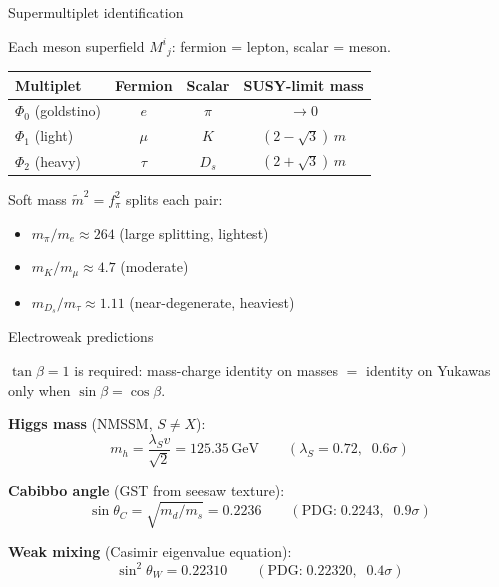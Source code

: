 \documentclass[aspectratio=169,12pt]{beamer}
\newcommand{\GeV}{\,\text{GeV}}
\newcommand{\fpi}{f_\pi}
\begin{document}
\begin{frame}{Supermultiplet identification}

Each meson superfield $M^i{}_j$: fermion = lepton,
scalar = meson.

\bigskip
\begin{center}
\begin{tabular}{lccc}
\toprule
Multiplet & Fermion & Scalar & SUSY-limit mass \\
\midrule
$\Phi_0$ (goldstino) & $e$ & $\pi$ & $\to 0$ \\
$\Phi_1$ (light) & $\mu$ & $K$ & $(2{-}\sqrt{3})\,m$ \\
$\Phi_2$ (heavy) & $\tau$ & $D_s$ & $(2{+}\sqrt{3})\,m$ \\
\bottomrule
\end{tabular}
\end{center}

\bigskip
Soft mass $\tilde m^2 = \fpi^2$ splits each pair:
\begin{itemize}
\item $m_\pi/m_e \approx 264$ (large splitting, lightest)
\item $m_K/m_\mu \approx 4.7$ (moderate)
\item $m_{D_s}/m_\tau \approx 1.11$ (near-degenerate, heaviest)
\end{itemize}

\end{frame}

\begin{frame}{Electroweak predictions}

\textbf{$\tan\beta = 1$} is required: mass-charge identity on
masses $=$ identity on Yukawas only when $\sin\beta = \cos\beta$.

\bigskip
\textbf{Higgs mass} (NMSSM, $S \neq X$):
\begin{equation*}
m_h = \frac{\lambda_S v}{\sqrt{2}} = 125.35\GeV
\qquad (\lambda_S = 0.72,\;\; 0.6\sigma)
\end{equation*}

\bigskip
\textbf{Cabibbo angle} (GST from seesaw texture):
\begin{equation*}
\sin\theta_C = \sqrt{m_d/m_s} = 0.2236
\qquad (\text{PDG:}\; 0.2243,\;\; 0.9\sigma)
\end{equation*}

\bigskip
\textbf{Weak mixing} (Casimir eigenvalue equation):
\begin{equation*}
\sin^2\theta_W = 0.22310
\qquad (\text{PDG:}\; 0.22320,\;\; 0.4\sigma)
\end{equation*}

\end{frame}
\end{document}
